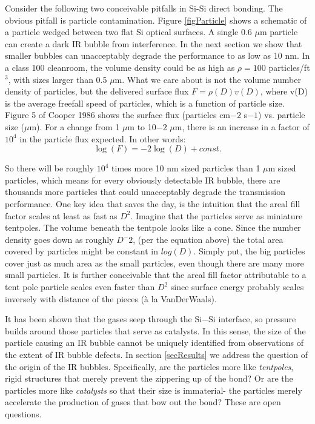 \documentclass[osajnl,preprint,showpacs,superscriptaddress,12pt]{revtex4-1} %
\begin{document}
Consider the following two conceivable pitfalls in Si-Si direct bonding.  The obvious pitfall is particle contamination.  Figure \ref{figParticle} shows a schematic of a particle wedged between two flat Si optical surfaces.  A single 0.6 $\mu$m particle can create a dark IR bubble from interference.  In the next section we show that smaller bubbles can unacceptably degrade the performance to as low as 10 nm.  In a class 100 cleanroom, the volume density could be as high as $\rho=100$ particles/ft$^3$, with sizes larger than 0.5 $\mu$m.  What we care about is not the volume number density of particles, but the delivered surface flux $F=\rho(D) v(D)$, where v(D) is the average freefall speed of particles, which is a function of particle size.  Figure 5 of Cooper 1986\cite{doi:10.1080/02786828608959094} shows the surface flux (particles cm$-2$ s$-1$) vs. particle size ($\mu$m).  For a change from 1 $\mu$m to 10$-2$ $\mu$m, there is an increase in a factor of $10^4$ in the particle flux expected.  In other words:
$$\log(F) = -2\log(D) + const.$$

So there will be roughly $10^4$ times more 10 nm sized particles than 1 $\mu$m sized particles, which means for every obviously detectable IR bubble, there are thousands more particles that could unacceptably degrade the transmission performance.  One key idea that saves the day, is the intuition that the areal fill factor scales at least as fast as $D^2$.  Imagine that the particles serve as miniature tentpoles.  The volume beneath the tentpole looks like a cone.  Since the number density goes down as roughly $D^-2$, (per the equation above) the total area covered by particles might be constant in $log(D)$.  Simply put, the big particles cover just as much area as the small particles, even though there are many more small particles.  It is further conceivable that the areal fill factor attributable to a tent pole particle scales even faster than $D^2$ since surface energy probably scales inversely with distance of the pieces (\`a la VanDerWaals).  

It has been shown\cite{1992JEMat..21..669M} that the gases seep through the Si$-$Si interface, so pressure builds around those particles that serve as catalysts.  In this sense, the size of the particle causing an IR bubble cannot be uniquely identified from observations of the extent of IR bubble defects.  In section \ref{secResults} we address the question of the origin of the IR bubbles.  Specifically, are the particles more like \emph{tentpoles}, rigid structures that merely prevent the zippering up of the bond?  Or are the particles more like \emph{catalysts} so that their size is immaterial- the particles merely accelerate the production of gases that bow out the bond?  These are open questions.
\end{document}
